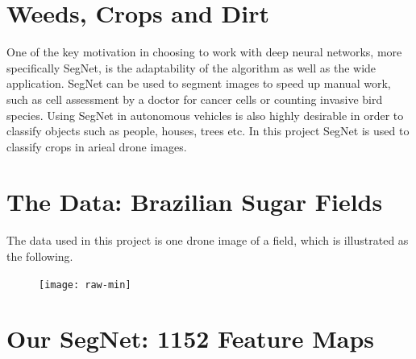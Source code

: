 \documentclass[
]{dtuposter}
\begin{document}
%
%
\begin{dtuposterhead} %
\end{dtuposterhead}
%
%
\begin{dtupostercontent}
\section{Weeds, Crops and Dirt}
 One of the key motivation in choosing to work with deep neural networks, more specifically
 SegNet, is the adaptability of the algorithm as well as the wide application. SegNet can be
 used to segment images to speed up manual work, such as cell assessment by a doctor for
 cancer cells or counting invasive bird species. Using SegNet in autonomous vehicles is also
 highly desirable in order to classify objects such as people, houses, trees etc. In this project SegNet is used to classify crops in arieal drone images. 
 
\section{The Data: Brazilian Sugar Fields}
The data used in this project is one drone image of a field, which is illustrated as the following.
\begin{figure}
\centering
\texttt{[image: raw-min]}
\end{figure}


\section{Our SegNet: 1152 Feature Maps}



\end{dtupostercontent}
\end{document}
